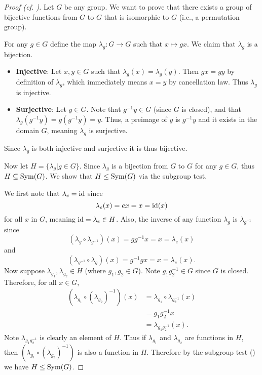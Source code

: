 \begin{proof}[Proof (cf. {\cite[Proof 2]{proofwiki_cayleys-theorem}})]
    Let $G$ be any group. We want to prove that there exists a group of bijective functions from $G$ to $G$ that is isomorphic to $G$ (i.e., a permutation group).

    For any $g \in G$ define the map $\lambda_g: G \to G$ such that $x \mapsto gx$. We claim that $\lambda_g$ is a bijection.
    \begin{itemize}
        \item \textbf{Injective}: Let $x, y \in G$ such that $\lambda_g(x) = \lambda_g(y)$. Then $gx = gy$ by definition of $\lambda_g$, which immediately means $x = y$ by cancellation law. Thus $\lambda_g$ is injective.

        \item \textbf{Surjective}: Let $y \in G$. Note that $g^{-1}y \in G$ (since $G$ is closed), and that $\lambda_g(g^{-1}y) = g(g^{-1}y) = y$. Thus, a preimage of $y$ is $g^{-1}y$ and it exists in the domain $G$, meaning $\lambda_g$ is surjective.
    \end{itemize}
    Since $\lambda_g$ is both injective and surjective it is thus bijective.

    Now let $H = \{\lambda_g \vert g \in G\}$. Since $\lambda_g$ is a bijection from $G$ to $G$ for any $g \in G$, thus $H \subseteq \mathrm{Sym}(G)$. We show that $H \leq \mathrm{Sym}(G)$ via the subgroup test.

    We first note that $\lambda_e = \mathrm{id}$ since
    \[
        \lambda_e(x) = ex = x = \mathrm{id}(x)
    \]
    for all $x$ in $G$, meaning $\mathrm{id} = \lambda_e \in H$. Also, the inverse of any function $\lambda_g$ is $\lambda_{g^{-1}}$ since
    \[
        (\lambda_g \circ \lambda_{g^{-1}})(x) = gg^{-1}x = x = \lambda_e(x)
    \]
    and
    \[
        (\lambda_{g^{-1}} \circ \lambda_g)(x) = g^{-1}gx = x = \lambda_e(x).
    \]
    Now suppose $\lambda_{g_1}, \lambda_{g_2} \in H$ (where $g_1, g_2 \in G$). Note $g_1g_2^{-1} \in G$ since $G$ is closed. Therefore, for all $x \in G$,
    \begin{align*}
        \left(\lambda_{g_1} \circ \left(\lambda_{g_2}\right)^{-1}\right)(x) &= \lambda_{g_1}\circ\lambda_{g_2^{-1}}(x)\\
        &= g_1g_2^{-1}x\\
        &= \lambda_{g_1g_2^{-1}}(x).
    \end{align*}
    Note $\lambda_{g_1g_2^{-1}}$ is clearly an element of $H$. Thus if $\lambda_{g_1}$ and $\lambda_{g_2}$ are functions in $H$, then $\left(\lambda_{g_1} \circ \left(\lambda_{g_2}\right)^{-1}\right)$ is also a function in $H$. Therefore by the subgroup test () we have $H \leq \mathrm{Sym}(G)$.


\end{proof}
